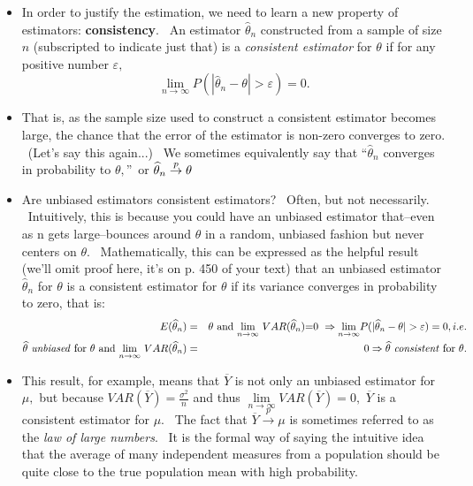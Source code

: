 \documentclass[11pt]{article}
\begin{document}
\begin{itemize}
\item In order to justify the estimation, we need to learn a new property of
estimators: \textbf{consistency}. \ An estimator $\widehat{\theta }_{n}$
constructed from a sample of size $n$ (subscripted to indicate just that) is
a \textit{consistent estimator }for $\theta $ if for any positive number $%
\varepsilon ,$%
\begin{equation*}
\underset{n\rightarrow \infty }{\lim }P(|\widehat{\theta }_{n}-\theta
|>\varepsilon )=0.
\end{equation*}

\item That is, as the sample size used to construct a consistent estimator
becomes large, the chance that the error of the estimator is non-zero
converges to zero. \ (Let's say this again...) \ We sometimes equivalently
say that \textquotedblleft $\widehat{\theta }_{n}$ converges in probability
to $\theta ,$\textquotedblright\ or $\widehat{\theta }_{n}\overset{p}{%
\rightarrow }\theta $

\item Are unbiased estimators consistent estimators? \ Often, but not
necessarily. \ Intuitively, this is because you could have an unbiased
estimator that--even as n gets large--bounces around $\theta $ in a random,
unbiased fashion but never centers on $\theta .$ \ Mathematically, this can
be expressed as the helpful result (we'll omit proof here, it's on p. 450 of
your text) that an unbiased estimator $\widehat{\theta }_{n}$ for $\theta $
is a consistent estimator for $\theta $ if its variance converges in
probability to zero, that is: 
\begin{eqnarray*}
E(\widehat{\theta }_{n}) &=&\theta \text{ and $\underset{n\rightarrow \infty 
}{\lim }$ }VAR\text{($\widehat{\theta }_{n}$)=0 }\Rightarrow \underset{%
n\rightarrow \infty }{\lim }P(|\widehat{\theta }_{n}-\theta |>\varepsilon
)=0,i.e. \\
\widehat{\theta }\text{ \textit{unbiased} for }\theta \text{ and $\underset{%
n\rightarrow \infty }{\lim }$ }VAR(\widehat{\theta }_{n}) &=&0\Rightarrow 
\widehat{\theta }\text{ \textit{consistent} for }\theta .
\end{eqnarray*}

\item This result, for example, means that $\overline{Y}$ is not only an
unbiased estimator for $\mu ,$ but because $VAR(\overline{Y})=\frac{\sigma
^{2}}{n}$ and thus $\underset{n\rightarrow \infty }{\lim }VAR(\overline{Y}%
)=0,$ $\overline{Y}$ is a consistent estimator for $\mu .$ \ The fact that $%
\overline{Y}\overset{p}{\rightarrow }\mu $ is sometimes referred to as the 
\textit{law of large numbers}. \ It is the formal way of saying the
intuitive idea that the average of many independent measures from a
population should be quite close to the true population mean with high
probability.


\end{itemize}
\end{document}
